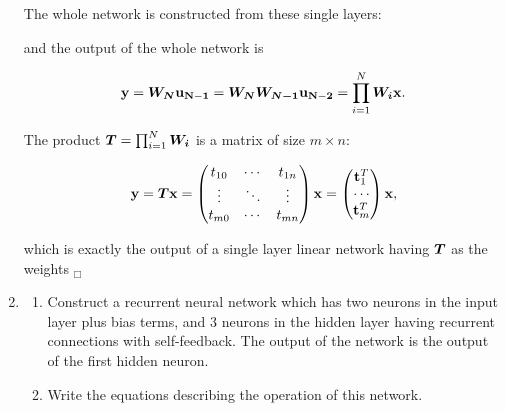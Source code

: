 \documentclass{exercise}
\begin{document}
\begin{enumerate}
\begin{solution}
    The whole network is constructed from these single layers:

    \begin{center}
      
    \end{center}
    
    and the output of the whole network is

    \begin{equation}
      {\bf{y}} = \boldsymbol{W_N} {\bf{u_{N-1}}} = \boldsymbol{W_N}  \boldsymbol{W_{N-1}}
      {\bf{u_{N-2}}} = \prod_{i = 1}^{N} \boldsymbol{W_i} {\bf{x}}.
    \end{equation}

    The product $\boldsymbol{T} = \prod_{i = 1}^{N} \boldsymbol{W_i}$ is a matrix of
    size $m \times n$: 

    \begin{equation}
      {\bf{y}} = \boldsymbol{T} {\bf{x}} = 
      \begin{pmatrix}
        t_{10} & \cdots & t_{1n} \\ \vdots & \ddots & \vdots \\
        t_{m0} & \cdots & t_{mn} 
      \end{pmatrix} {\bf{x}} = 
      \begin{pmatrix}  {\bf{t}}_1^T\\ \cdots \\
        {\bf{t}}_m^T 
      \end{pmatrix} {\bf{x}},
    \end{equation}
    
    which is exactly the output of a single layer linear network having
    $\boldsymbol{T}$ as the weights $_\Box$

  \end{solution}
  
\item

  \begin{enumerate}
  \item Construct a recurrent neural network which has two neurons in
    the input layer plus bias terms, and 3 neurons in the hidden layer
    having recurrent connections with self-feedback.  The output of
    the network is the output of the first hidden neuron.
  \item Write the equations describing the operation of this network.
  \end{enumerate}

  \begin{solution}
  \end{solution}
  
\end{enumerate}
\end{document}
